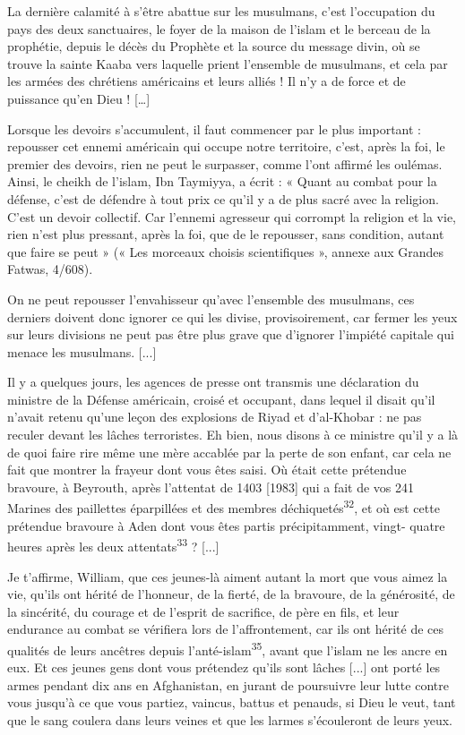 La dernière calamité à s'être abattue sur les musulmans, c'est
l'occupation du pays des deux sanctuaires, le foyer de la maison de
l'islam et le berceau de la prophétie, depuis le décès du Prophète et la
source du message divin, où se trouve la sainte Kaaba vers laquelle
prient l'ensemble de musulmans, et cela par les armées des chrétiens
américains et leurs alliés ! Il n'y a de force et de puissance qu'en
Dieu ! {[}\ldots{]}

Lorsque les devoirs s'accumulent, il faut commencer par le plus
important : repousser cet ennemi américain qui occupe notre territoire,
c'est, après la foi, le premier des devoirs, rien ne peut le surpasser,
comme l'ont affirmé les oulémas. Ainsi, le cheikh de l'islam, Ibn
Taymiyya, a écrit : « Quant au combat pour la défense, c'est de défendre
à tout prix ce qu'il y a de plus sacré avec la religion. C'est un devoir
collectif. Car l'ennemi agresseur qui corrompt la religion et la vie,
rien n'est plus pressant, après la foi, que de le repousser, sans
condition, autant que faire se peut » (« Les morceaux choisis
scientifiques », annexe aux Grandes Fatwas, 4/608).

On ne peut repousser l'envahisseur qu'avec l'ensemble des musulmans, ces
derniers doivent donc ignorer ce qui les divise, provisoirement, car
fermer les yeux sur leurs divisions ne peut pas être plus grave que
d'ignorer l'impiété capitale qui menace les musulmans. {[}...{]}

Il y a quelques jours, les agences de presse ont transmis une
déclaration du ministre de la Défense américain, croisé et occupant,
dans lequel il disait qu'il n'avait retenu qu'une leçon des explosions
de Riyad et d'al-Khobar : ne pas reculer devant les lâches terroristes.
Eh bien, nous disons à ce ministre qu'il y a là de quoi faire rire même
une mère accablée par la perte de son enfant, car cela ne fait que
montrer la frayeur dont vous êtes saisi. Où était cette prétendue
bravoure, à Beyrouth, après l'attentat de 1403 {[}1983{]} qui a fait de
vos 241 Marines des paillettes éparpillées et des membres
déchiquetés\textsuperscript{32}, et où est cette prétendue bravoure à
Aden dont vous êtes partis précipitamment, vingt- quatre heures après
les deux attentats\textsuperscript{33} ? {[}...{]}

Je t'affirme, William, que ces jeunes-là aiment autant la mort que vous
aimez la vie, qu'ils ont hérité de l'honneur, de la fierté, de la
bravoure, de la générosité, de la sincérité, du courage et de l'esprit
de sacrifice, de père en fils, et leur endurance au combat se vérifiera
lors de l'affrontement, car ils ont hérité de ces qualités de leurs
ancêtres depuis l'anté-islam\textsuperscript{35}, avant que l'islam ne
les ancre en eux. Et ces jeunes gens dont vous prétendez qu'ils sont
lâches {[}...{]} ont porté les armes pendant dix ans en Afghanistan, en
jurant de poursuivre leur lutte contre vous jusqu'à ce que vous partiez,
vaincus, battus et penauds, si Dieu le veut, tant que le sang coulera
dans leurs veines et que les larmes s'écouleront de leurs yeux.

